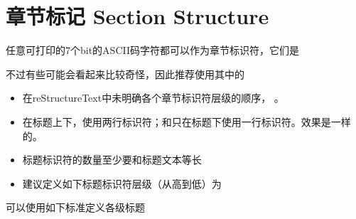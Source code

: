 \documentclass[a4paper,10pt,english]{sphinxmanual}
\begin{document}
\section{章节标记 Section Structure}
\label{\detokenize{reStructureText_syntax:section-structure}}
\sphinxAtStartPar
任意可打印的7个bit的ASCII码字符都可以作为章节标识符，它们是

\sphinxAtStartPar
{}

\sphinxAtStartPar
不过有些可能会看起来比较奇怪，因此推荐使用其中的

\sphinxAtStartPar
{}
\begin{itemize}
\item {} 
\sphinxAtStartPar
在reStructureText中未明确各个章节标识符层级的顺序， 。

\item {} 
\sphinxAtStartPar
在标题上下，使用两行标识符；和只在标题下使用一行标识符。效果是一样的。

\item {} 
\sphinxAtStartPar
标题标识符的数量至少要和标题文本等长

\item {} 
\sphinxAtStartPar
建议定义如下标题标识符层级（从高到低）为  

\end{itemize}

\sphinxAtStartPar
可以使用如下标准定义各级标题

\begin{sphinxVerbatim}[commandchars=\\\{\}]
\end{sphinxVerbatim}
\end{document}
